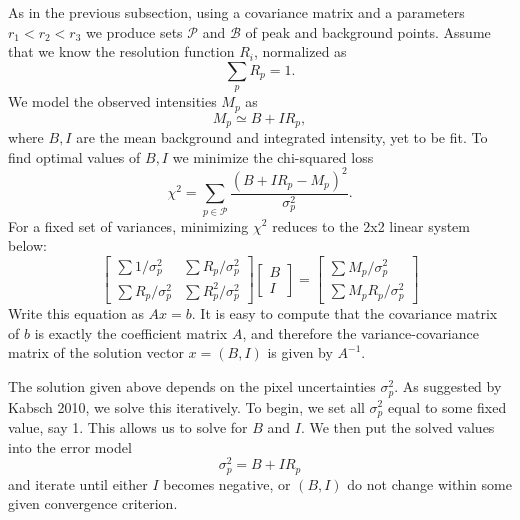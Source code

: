 \documentclass[11pt,a4paper]{article}
\def\calP{\mathcal{P}}
\def\calB{\mathcal{B}}
\begin{document}
As in the previous subsection, using a covariance matrix and a parameters $r_1 < r_2 < r_3$ we produce sets $\calP$ and $\calB$ of peak and background points.
Assume that we know the resolution function $R_i$,
normalized as
\begin{equation}\label{Eresnor}
  \sum_p R_p = 1.
\end{equation}
We model the observed intensities $M_p$ as
\begin{equation} M_p \simeq B + I R_p, \end{equation}
where $B, I$ are the mean background and integrated intensity, yet to be fit. To find optimal values of $B,I$ we minimize the chi-squared loss
\begin{equation} \chi^2 = \sum_{p \in \calP} \frac{(B+IR_p - M_p)^2}{\sigma^2_p}. \end{equation}
For a fixed set of variances, minimizing $\chi^2$ reduces to the 2x2 linear system below:
\begin{equation}
  \begin{bmatrix}
    \sum 1/\sigma^2_p & \sum R_p / \sigma^2_p \\
    \sum R_p/\sigma_p^2 & \sum R_p^2 / \sigma^2_p
  \end{bmatrix}
  \begin{bmatrix}
    B \\
    I
  \end{bmatrix}
  =
  \begin{bmatrix}
    \sum M_p/\sigma^2_p \\
    \sum M_p R_p / \sigma^2_p
  \end{bmatrix}
\end{equation}
Write this equation as $Ax = b$. It is easy to compute that the covariance matrix of $b$ is exactly the coefficient matrix
 $A$, and therefore the variance-covariance matrix of the solution vector $x = (B, I)$ is given by $A^{-1}$.

The solution given above depends on the pixel uncertainties $\sigma_p^2$. As suggested by Kabsch 2010, we solve this iteratively. To begin, we set all $\sigma^2_p$ equal to some fixed value, say 1. This allows us to solve for $B$ and $I$. We then put the solved values into the error model
\begin{equation} \sigma_p^2 = B + I R_p \end{equation}
and iterate until either $I$ becomes negative, or $(B, I)$ do not change within some given convergence criterion.
\end{document}
